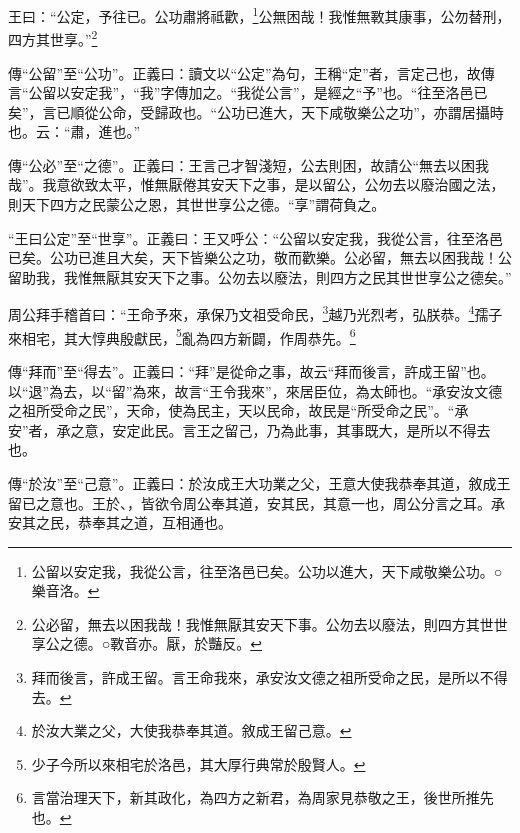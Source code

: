 王曰：“公定，予往已。公功肅將祗歡，\footnote{公留以安定我，我從公言，往至洛邑已矣。公功以進大，天下咸敬樂公功。○樂音洛。}公無困哉！我惟無斁其康事，公勿替刑，四方其世享。”\footnote{公必留，無去以困我哉！我惟無厭其安天下事。公勿去以廢法，則四方其世世享公之德。○斁音亦。厭，於豔反。}


{\noindent\zhuan{}\fzbyks 傳“公留”至“公功”。正義曰：讀文以“公定”為句，王稱“定”者，言定己也，故傳言“公留以安定我”，“我”字傳加之。“我從公言”，是經之“予”也。“往至洛邑已矣”，言已順從公命，受歸政也。“公功已進大，天下咸敬樂公之功”，亦謂居攝時也。云：“肅，進也。” \par}

{\noindent\zhuan{}\fzbyks 傳“公必”至“之德”。正義曰：王言己才智淺短，公去則困，故請公“無去以困我哉”。我意欲致太平，惟無厭倦其安天下之事，是以留公，公勿去以廢治國之法，則天下四方之民蒙公之恩，其世世享公之德。“享”謂荷負之。 \par}

{\noindent\shu{}\fzkt “王曰公定”至“世享”。正義曰：王又呼公：“公留以安定我，我從公言，往至洛邑已矣。公功已進且大矣，天下皆樂公之功，敬而歡樂。公必留，無去以困我哉！公留助我，我惟無厭其安天下之事。公勿去以廢法，則四方之民其世世享公之德矣。” \par}

周公拜手稽首曰：“王命予來，承保乃文祖受命民，\footnote{拜而後言，許成王留。言王命我來，承安汝文德之祖所受命之民，是所以不得去。}越乃光烈考，弘朕恭。\footnote{於汝大業之父，大使我恭奉其道。敘成王留己意。}孺子來相宅，其大惇典殷獻民，\footnote{少子今所以來相宅於洛邑，其大厚行典常於殷賢人。}亂為四方新闢，作周恭先。\footnote{言當治理天下，新其政化，為四方之新君，為周家見恭敬之王，後世所推先也。}


{\noindent\zhuan{}\fzbyks 傳“拜而”至“得去”。正義曰：“拜”是從命之事，故云“拜而後言，許成王留”也。以“退”為去，以“留”為來，故言“王令我來”，來居臣位，為太師也。“承安汝文德之祖所受命之民”，天命，使為民主，天以民命，故民是“所受命之民”。“承安”者，承之意，安定此民。言王之留己，乃為此事，其事既大，是所以不得去也。 \par}

{\noindent\zhuan{}\fzbyks 傳“於汝”至“己意”。正義曰：於汝成王大功業之父，王意大使我恭奉其道，敘成王留已之意也。王於、，皆欲令周公奉其道，安其民，其意一也，周公分言之耳。承安其之民，恭奉其之道，互相通也。 \par}

